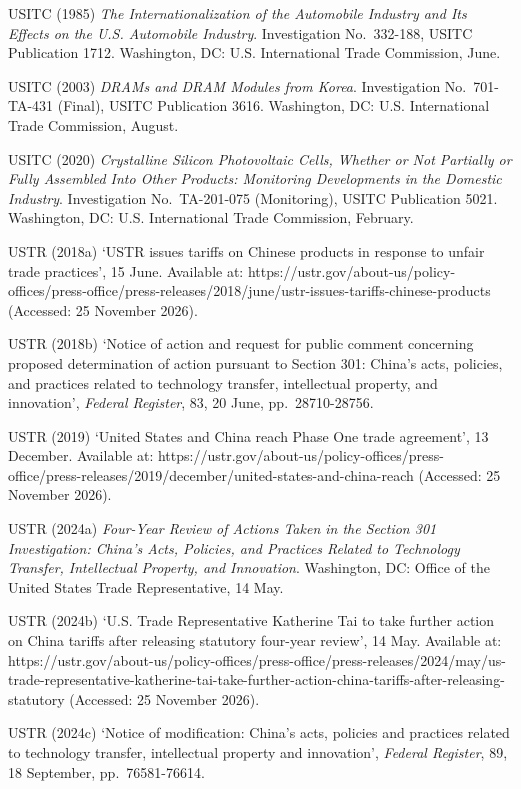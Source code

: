 USITC (1985) \emph{The Internationalization of the Automobile Industry
and Its Effects on the U.S. Automobile Industry}. Investigation
No.~332-188, USITC Publication 1712. Washington, DC: U.S. International
Trade Commission, June.

USITC (2003) \emph{DRAMs and DRAM Modules from Korea}. Investigation
No.~701-TA-431 (Final), USITC Publication 3616. Washington, DC: U.S.
International Trade Commission, August.

USITC (2020) \emph{Crystalline Silicon Photovoltaic Cells, Whether or
Not Partially or Fully Assembled Into Other Products: Monitoring
Developments in the Domestic Industry}. Investigation No.~TA-201-075
(Monitoring), USITC Publication 5021. Washington, DC: U.S. International
Trade Commission, February.

USTR (2018a) `USTR issues tariffs on Chinese products in response to
unfair trade practices', 15 June. Available at:
https://ustr.gov/about-us/policy-offices/press-office/press-releases/2018/june/ustr-issues-tariffs-chinese-products
(Accessed: 25 November 2026).

USTR (2018b) `Notice of action and request for public comment concerning
proposed determination of action pursuant to Section 301: China's acts,
policies, and practices related to technology transfer, intellectual
property, and innovation', \emph{Federal Register}, 83, 20 June,
pp.~28710-28756.

USTR (2019) `United States and China reach Phase One trade agreement',
13 December. Available at:
https://ustr.gov/about-us/policy-offices/press-office/press-releases/2019/december/united-states-and-china-reach
(Accessed: 25 November 2026).

USTR (2024a) \emph{Four-Year Review of Actions Taken in the Section 301
Investigation: China's Acts, Policies, and Practices Related to
Technology Transfer, Intellectual Property, and Innovation}. Washington,
DC: Office of the United States Trade Representative, 14 May.

USTR (2024b) `U.S. Trade Representative Katherine Tai to take further
action on China tariffs after releasing statutory four-year review', 14
May. Available at:
https://ustr.gov/about-us/policy-offices/press-office/press-releases/2024/may/us-trade-representative-katherine-tai-take-further-action-china-tariffs-after-releasing-statutory
(Accessed: 25 November 2026).

USTR (2024c) `Notice of modification: China's acts, policies and
practices related to technology transfer, intellectual property and
innovation', \emph{Federal Register}, 89, 18 September, pp.~76581-76614.

